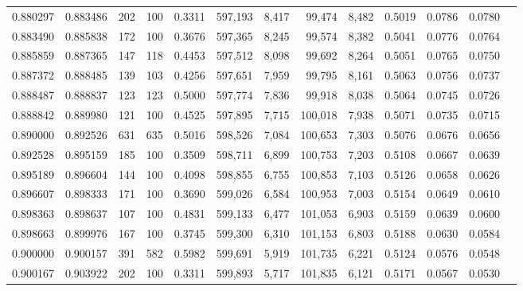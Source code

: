 \begin{tabular}{rrrrrrrrrrrrr}
0.880297 & 0.883486 &   202 & 100 &                                     0.3311 & 597,193 &   8,417 &  99,474 &   8,482 & 0.5019 & 0.0786 & 0.0780 \\
0.883490 & 0.885838 &   172 & 100 &                                     0.3676 & 597,365 &   8,245 &  99,574 &   8,382 & 0.5041 & 0.0776 & 0.0764 \\
0.885859 & 0.887365 &   147 & 118 &                                     0.4453 & 597,512 &   8,098 &  99,692 &   8,264 & 0.5051 & 0.0765 & 0.0750 \\
0.887372 & 0.888485 &   139 & 103 &                                     0.4256 & 597,651 &   7,959 &  99,795 &   8,161 & 0.5063 & 0.0756 & 0.0737 \\
0.888487 & 0.888837 &   123 & 123 &                                     0.5000 & 597,774 &   7,836 &  99,918 &   8,038 & 0.5064 & 0.0745 & 0.0726 \\
0.888842 & 0.889980 &   121 & 100 &                                     0.4525 & 597,895 &   7,715 & 100,018 &   7,938 & 0.5071 & 0.0735 & 0.0715 \\
0.890000 & 0.892526 &   631 & 635 &                                     0.5016 & 598,526 &   7,084 & 100,653 &   7,303 & 0.5076 & 0.0676 & 0.0656 \\
0.892528 & 0.895159 &   185 & 100 &                                     0.3509 & 598,711 &   6,899 & 100,753 &   7,203 & 0.5108 & 0.0667 & 0.0639 \\
0.895189 & 0.896604 &   144 & 100 &                                     0.4098 & 598,855 &   6,755 & 100,853 &   7,103 & 0.5126 & 0.0658 & 0.0626 \\
0.896607 & 0.898333 &   171 & 100 &                                     0.3690 & 599,026 &   6,584 & 100,953 &   7,003 & 0.5154 & 0.0649 & 0.0610 \\
0.898363 & 0.898637 &   107 & 100 &                                     0.4831 & 599,133 &   6,477 & 101,053 &   6,903 & 0.5159 & 0.0639 & 0.0600 \\
0.898663 & 0.899976 &   167 & 100 &                                     0.3745 & 599,300 &   6,310 & 101,153 &   6,803 & 0.5188 & 0.0630 & 0.0584 \\
0.900000 & 0.900157 &   391 & 582 &                                     0.5982 & 599,691 &   5,919 & 101,735 &   6,221 & 0.5124 & 0.0576 & 0.0548 \\
0.900167 & 0.903922 &   202 & 100 &                                     0.3311 & 599,893 &   5,717 & 101,835 &   6,121 & 0.5171 & 0.0567 & 0.0530 \\

\end{tabular}
